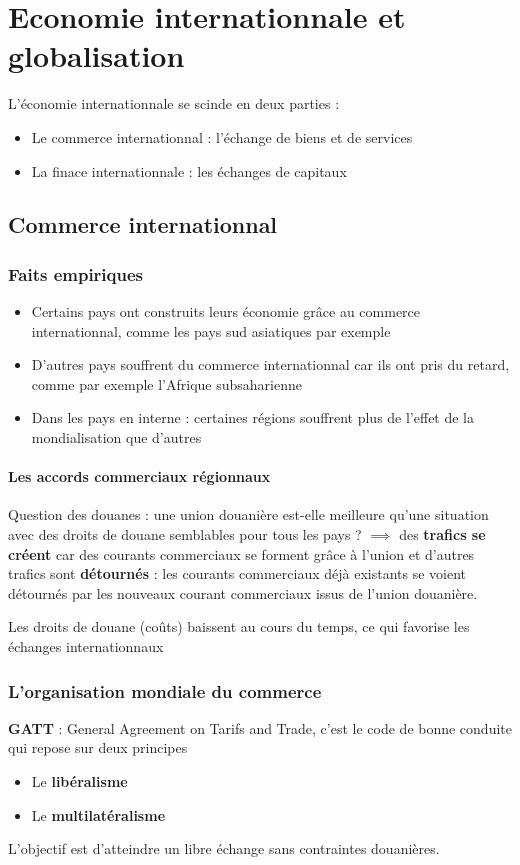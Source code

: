 \chapter{Economie internationnale et globalisation}
L'économie internationnale se scinde en deux parties :
\begin{itemize}
    \item Le commerce internationnal : l'échange de biens et de services
    \item La finace internationnale : les échanges de capitaux
\end{itemize}
\section{Commerce internationnal}
\subsection{Faits empiriques}
\begin{itemize}
    \item Certains pays ont construits leurs économie grâce au commerce internationnal, comme les pays sud asiatiques par exemple
    \item D'autres pays souffrent du commerce internationnal car ils ont pris du retard, comme par exemple l'Afrique subsaharienne
    \item Dans les pays en interne : certaines régions souffrent plus de l'effet de la mondialisation que d'autres
\end{itemize}
\newpage
\subsubsection{Les accords commerciaux régionnaux}
Question des douanes : une union douanière est-elle meilleure qu'une situation avec des droits de douane semblables pour tous les pays ? \newline
$\implies$ des \textbf{trafics se créent} car des courants commerciaux se forment grâce à l'union et d'autres trafics sont \textbf{détournés} : les courants commerciaux déjà existants se voient détournés par les nouveaux courant commerciaux issus de l'union douanière. \newline

Les droits de douane (coûts) baissent au cours du temps, ce qui favorise les échanges internationnaux

\subsection{L'organisation mondiale du commerce}
\textbf{GATT} : General Agreement on Tarifs and Trade, c'est le code de bonne conduite qui repose sur deux principes
\begin{itemize}
    \item Le \textbf{libéralisme}
    \item Le \textbf{multilatéralisme}
\end{itemize}
L'objectif est d'atteindre un libre échange sans contraintes douanières.
\newpage
